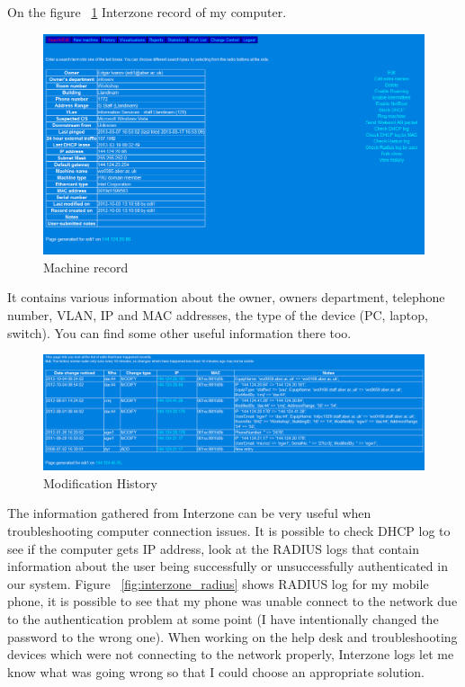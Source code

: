 \documentclass[10pt,a4paper,headinclude=true,twoside]{report}
\begin{document}
On the figure ~\ref{fig:machine_record} Interzone record of my computer.

\begin{figure}[H]
\centering
\centerline{\includegraphics[scale=0.5]{./machine_record}}
\caption{Machine record}
\label{fig:machine_record}
\end{figure}

It contains various information about the owner, owners department, telephone number, VLAN, IP and MAC addresses, the type of the device (PC, laptop, switch). You can find some other useful information there too.

\begin{figure}[H]
\centering
\centerline{\includegraphics[scale=0.5]{./modification_history}}
\caption{Modification History}
\label{fig:modification_history}
\end{figure}

The information gathered from Interzone can be very useful when troubleshooting computer connection issues. It is possible to check DHCP log to see if the computer gets IP address, look at the RADIUS logs that contain information about the user being successfully or unsuccessfully authenticated in our system. Figure ~\ref{fig:interzone_radius} shows RADIUS log for my mobile phone, it is possible to see that my phone was unable connect to the network due to the authentication problem at some point (I have intentionally changed the password to the wrong one). When working on the help desk and troubleshooting devices which were not connecting to the network properly, Interzone logs let me know what was going wrong so that I could choose an appropriate solution. 
\end{document}
